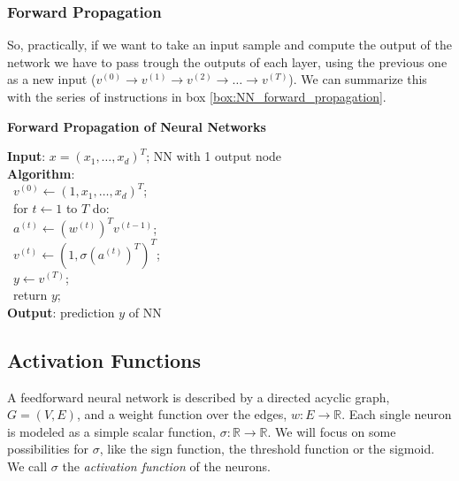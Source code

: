 \documentclass[12pt]{report}
\theoremstyle{plain}
\begin{document}
\begin{flushleft}
\subsubsection{Forward Propagation}
So, practically, if we want to take an input sample and compute the output of the network we have to pass trough the outputs of each layer, using the previous one as a new input ($v^{(0)}\to v^{(1)}\to v^{(2)} \to\dots\to v^{(T)}$). We can summarize this with the series of instructions in box \ref{box:NN_forward_propagation}.

\begin{tcolorbox}
	\begin{center}
		\textbf{Forward Propagation of Neural Networks}
	\end{center}
	\textbf{Input}: \quad $x=\left(x_1,\dots,x_d\right)^T$; NN with 1 output node\\ 

	\textbf{Algorithm}:\\
	\-\ $v^{(0)}\leftarrow\left(1,x_1,\dots,x_d\right)^T$;\\
	\-\ for $t\leftarrow 1$ to $T$ do:\\
	\-\ \qquad\quad $a^{(t)}\leftarrow\left(w^{(t)}\right)^Tv^{(t-1)}$;\\
	\-\ \qquad\quad $v^{(t)}\leftarrow\left(1,\sigma(a^{(t)})^T\right)^T$;\\
	\-\ \qquad\quad $y\leftarrow v^{(T)}$;\\
	\-\ return $y$;\\
	
	\textbf{Output}: prediction $y$ of NN\\
	
	\label{box:NN_forward_propagation}
\end{tcolorbox}

\subsection{Activation Functions}
A feedforward neural network is described by a directed acyclic graph, $G=(V,E)$, and a weight function over the edges, $w:E\to\mathds{R}$. Each single neuron is modeled as a simple scalar function, $\sigma:\mathds{R}\to\mathds{R}$. We will focus on some possibilities for $\sigma$, like the sign function, the threshold function or the sigmoid. We call $\sigma$ the \textit{activation function} of the neurons. 

\end{flushleft}
\end{document}
